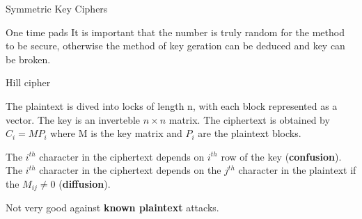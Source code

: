 \documentclass[12pt, letterpaper]{article}
\begin{document}
\begin{section}{Symmetric Key Ciphers}
\begin{subsection}{One time pads}
    It is important that the number is truly random for the method to be secure,
    otherwise the method of key geration can be deduced and key can be broken.

  \end{subsection}

  \begin{subsection}{Hill cipher}

    The plaintext is dived into locks of length n, with each block represented
    as a vector. The key is an inverteble \(n \times n\) matrix. The
    ciphertext is obtained by \(C_{i} = MP_{i}\) where M is the key matrix and
    \(P_{i}\) are the plaintext blocks.

    The \(i^{th}\) character in the ciphertext depends on \(i^{th}\) row of
    the key (\textbf{confusion}). \\
    The \(i^{th}\) character in the ciphertext depends on the \(j^{th}\)
    character in the plaintext if the \(M_{ij} \neq 0\) (\textbf{diffusion}).

    Not very good against \textbf{known plaintext} attacks.

  \end{subsection}

\end{section}

\newpage
\end{document}
